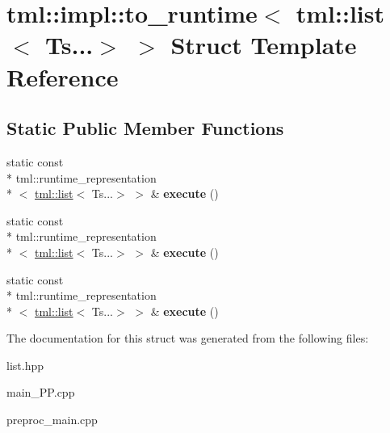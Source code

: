 \hypertarget{structtml_1_1impl_1_1to__runtime_3_01tml_1_1list_3_01Ts_8_8_8_4_01_4}{\section{tml\+:\+:impl\+:\+:to\+\_\+runtime$<$ tml\+:\+:list$<$ Ts...$>$ $>$ Struct Template Reference}
\label{structtml_1_1impl_1_1to__runtime_3_01tml_1_1list_3_01Ts_8_8_8_4_01_4}
}
\subsection*{Static Public Member Functions}
\begin{DoxyCompactItemize}
\item 
\hypertarget{structtml_1_1impl_1_1to__runtime_3_01tml_1_1list_3_01Ts_8_8_8_4_01_4_a8d3c31f7dc06723fa08b48c705e59292}{static const \\*
tml\+::runtime\+\_\+representation\\*
$<$ \hyperlink{structtml_1_1list}{tml\+::list}$<$ Ts...$>$ $>$ \& {\bfseries execute} ()}\label{structtml_1_1impl_1_1to__runtime_3_01tml_1_1list_3_01Ts_8_8_8_4_01_4_a8d3c31f7dc06723fa08b48c705e59292}

\item 
\hypertarget{structtml_1_1impl_1_1to__runtime_3_01tml_1_1list_3_01Ts_8_8_8_4_01_4_a8d3c31f7dc06723fa08b48c705e59292}{static const \\*
tml\+::runtime\+\_\+representation\\*
$<$ \hyperlink{structtml_1_1list}{tml\+::list}$<$ Ts...$>$ $>$ \& {\bfseries execute} ()}\label{structtml_1_1impl_1_1to__runtime_3_01tml_1_1list_3_01Ts_8_8_8_4_01_4_a8d3c31f7dc06723fa08b48c705e59292}

\item 
\hypertarget{structtml_1_1impl_1_1to__runtime_3_01tml_1_1list_3_01Ts_8_8_8_4_01_4_a8d3c31f7dc06723fa08b48c705e59292}{static const \\*
tml\+::runtime\+\_\+representation\\*
$<$ \hyperlink{structtml_1_1list}{tml\+::list}$<$ Ts...$>$ $>$ \& {\bfseries execute} ()}\label{structtml_1_1impl_1_1to__runtime_3_01tml_1_1list_3_01Ts_8_8_8_4_01_4_a8d3c31f7dc06723fa08b48c705e59292}

\end{DoxyCompactItemize}


The documentation for this struct was generated from the following files\+:\begin{DoxyCompactItemize}
\item 
list.\+hpp\item 
main\+\_\+\+P\+P.\+cpp\item 
preproc\+\_\+main.\+cpp\end{DoxyCompactItemize}
